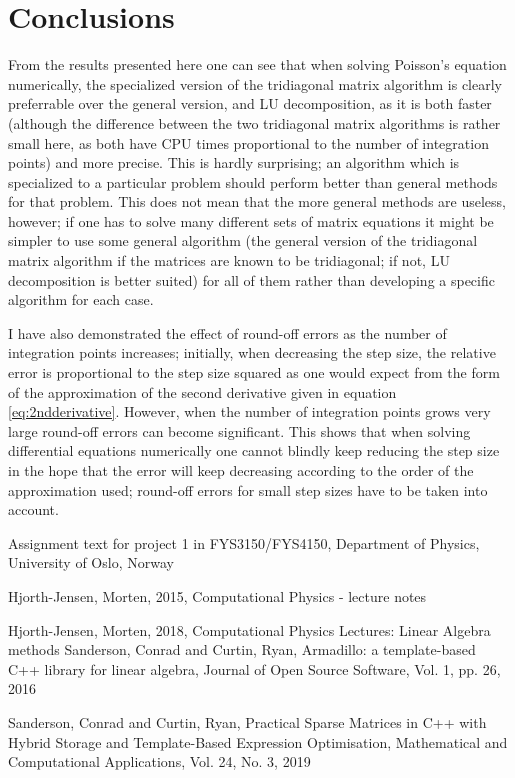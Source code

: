 \documentclass[a4paper,english]{article}
\begin{document}
\section{Conclusions}
From the results presented here one can see that when solving Poisson's equation numerically, the specialized version of the tridiagonal matrix algorithm is clearly preferrable over the general version, and LU decomposition, as it is both faster (although the difference between the two tridiagonal matrix algorithms is rather small here, as both have CPU times proportional to the number of integration points) and more precise. This is hardly surprising; an algorithm which is specialized to a particular problem should perform better than general methods for that problem. This does not mean that the more general methods are useless, however; if one has to solve many different sets of matrix equations it might be simpler to use some general algorithm (the general version of the tridiagonal matrix algorithm if the matrices are known to be tridiagonal; if not, LU decomposition is better suited) for all of them rather than developing a specific algorithm for each case. \par
I have also demonstrated the effect of round-off errors as the number of integration points increases; initially, when decreasing the step size, the relative error is proportional to the step size squared as one would expect from the form of the approximation of the second derivative given in equation \ref{eq:2ndderivative}. However, when the number of integration points grows very large round-off errors can become significant. This shows that when solving differential equations numerically one cannot blindly keep reducing the step size in the hope that the error will keep decreasing according to the order of the approximation used; round-off errors for small step sizes have to be taken into account.

\begin{thebibliography}{}
    Assignment text for project 1 in FYS3150/FYS4150,
    Department of Physics, University of Oslo, Norway

    Hjorth-Jensen, Morten,
    2015,
    Computational Physics - lecture notes

    Hjorth-Jensen, Morten,
    2018,
    Computational Physics Lectures: Linear Algebra methods
    Sanderson, Conrad and Curtin, Ryan,
    Armadillo: a template-based C++ library for linear algebra,
    Journal of Open Source Software, Vol. 1, pp. 26, 2016

    Sanderson, Conrad and Curtin, Ryan,
    Practical Sparse Matrices in C++ with Hybrid Storage and Template-Based Expression Optimisation,
    Mathematical and Computational Applications, Vol. 24, No. 3, 2019
\end{thebibliography}
\end{document}
